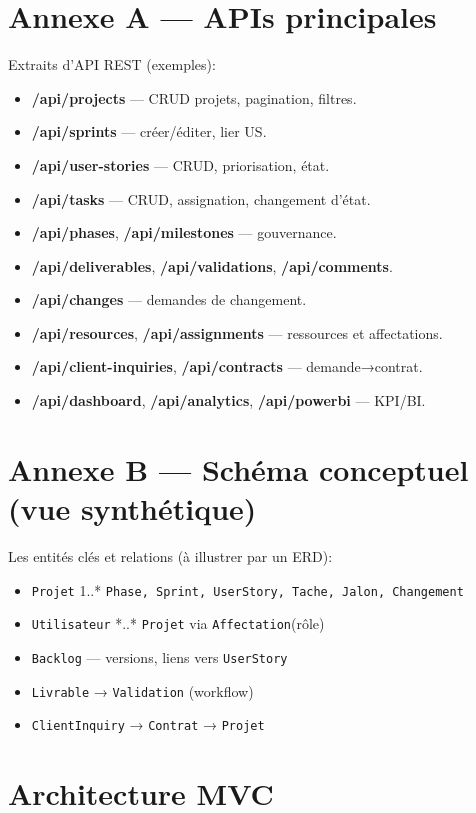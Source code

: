 \section{Annexe A — APIs principales}
Extraits d’API REST (exemples):
\begin{itemize}
  \item \textbf{/api/projects} — CRUD projets, pagination, filtres.
  \item \textbf{/api/sprints} — créer/éditer, lier US.
  \item \textbf{/api/user-stories} — CRUD, priorisation, état.
  \item \textbf{/api/tasks} — CRUD, assignation, changement d’état.
  \item \textbf{/api/phases}, \textbf{/api/milestones} — gouvernance.
  \item \textbf{/api/deliverables}, \textbf{/api/validations}, \textbf{/api/comments}.
  \item \textbf{/api/changes} — demandes de changement.
  \item \textbf{/api/resources}, \textbf{/api/assignments} — ressources et affectations.
  \item \textbf{/api/client-inquiries}, \textbf{/api/contracts} — demande→contrat.
  \item \textbf{/api/dashboard}, \textbf{/api/analytics}, \textbf{/api/powerbi} — KPI/BI.
\end{itemize}

\section{Annexe B — Schéma conceptuel (vue synthétique)}
Les entités clés et relations (à illustrer par un ERD):
\begin{itemize}
  \item \texttt{Projet} 1..* \texttt{Phase, Sprint, UserStory, Tache, Jalon, Changement}
  \item \texttt{Utilisateur} *..* \texttt{Projet} via \texttt{Affectation}(rôle)
  \item \texttt{Backlog} — versions, liens vers \texttt{UserStory}
  \item \texttt{Livrable} → \texttt{Validation} (workflow)
  \item \texttt{ClientInquiry} → \texttt{Contrat} → \texttt{Projet}
\end{itemize}

\section{Architecture MVC}

